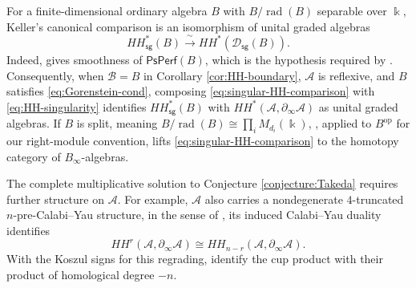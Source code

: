 \documentclass[11pt,letterpaper,reqno]{amsart}
\theoremstyle{plain}
\theoremstyle{definition}
\theoremstyle{plain}
\theoremstyle{definition}
\numberwithin{equation}{section}
\begin{document}
For a finite-dimensional ordinary algebra $B$ with $B/\operatorname{rad}(B)$ separable over $\Bbbk$, Keller's canonical comparison is an isomorphism of unital graded algebras
\begin{equation}\label{eq:singular-HH-comparison}
HH^*_{\mathsf{sg}}(B)\xrightarrow{\;\sim\;}HH^*(\mathscr D_{\mathsf{sg}}(B)).
\end{equation}
Indeed, \cite[Theorem 3.7]{Elagin-Lunts-Schnurer2020} gives smoothness of $\mathsf{PsPerf}(B)$, which is the hypothesis required by \cite[Theorem 1.1]{Keller2020}.
Consequently, when $\mathscr B=B$ in Corollary \ref{cor:HH-boundary}, $\mathscr A$ is reflexive, and $B$ satisfies \eqref{eq:Gorenstein-cond}, composing \eqref{eq:singular-HH-comparison} with \eqref{eq:HH-singularity} identifies $HH^*_{\mathsf{sg}}(B)$ with $HH^*(\mathscr A,\partial_\infty\mathscr A)$ as unital graded algebras.
If $B$ is split, meaning $B/\operatorname{rad}(B)\cong\prod_i M_{d_i}(\Bbbk)$, \cite[Theorem 1.1]{Xi-Zhang2026}, applied to $B^{\mathrm{op}}$ for our right-module convention, lifts \eqref{eq:singular-HH-comparison} to the homotopy category of $B_\infty$-algebras.

The complete multiplicative solution to Conjecture \ref{conjecture:Takeda} requires further structure on $\mathscr A$.
For example, $\mathscr A$ also carries a nondegenerate $4$-truncated $n$-pre-Calabi--Yau structure, in the sense of \cite[Definitions 2.9 and 2.11]{Rivera-Takeda-Wang2024}, its induced Calabi--Yau duality identifies
\[
HH^r(\mathscr A,\partial_\infty\mathscr A)
\cong HH_{n-r}(\mathscr A,\partial_\infty\mathscr A).
\]
With the Koszul signs for this regrading, \cite[Proposition 5.8 and Theorem 5.11]{Rivera-Takeda-Wang2024} identify the cup product with their product of homological degree $-n$.


\printbibliography
\end{document}
